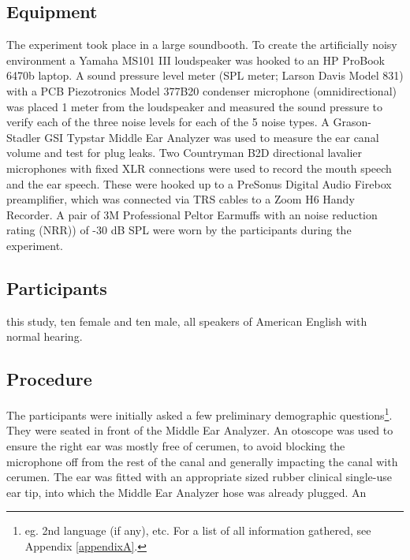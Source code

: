   
\subsection{Equipment}

The experiment took place in a large soundbooth.  To create the artificially noisy environment a Yamaha MS101 III loudspeaker was hooked to an HP ProBook 6470b laptop.  A sound pressure level meter (SPL meter; Larson Davis Model 831) with a PCB Piezotronics Model 377B20 condenser microphone (omnidirectional) was placed 1 meter from the loudspeaker and measured the sound pressure to verify each of the three noise levels for each of the 5 noise types. A Grason-Stadler GSI Typstar Middle Ear Analyzer was used to measure the ear canal volume and test for plug leaks.  Two Countryman B2D directional lavalier microphones with fixed XLR connections were used to record the mouth speech and the ear speech.  These were hooked up to a PreSonus Digital Audio Firebox preamplifier, which was connected via TRS cables to a Zoom H6 Handy Recorder. A pair of 3M Professional Peltor Earmuffs with an noise reduction rating (NRR)) of -30 dB SPL were worn by the participants during the experiment.


\subsection{Participants}
\DIFdelbegin {}\DIFdelend \DIFaddbegin {}\DIFaddend this study, \DIFaddbegin {}\DIFaddend ten female and ten male, all \DIFdelbegin {}\DIFdelend \DIFaddbegin {}\DIFaddend speakers of American English with normal hearing.

\subsection{Procedure}\label{chap2:methods:procedure}

The participants were initially asked a few preliminary demographic questions\footnote{eg. 2nd language (if any), etc. For a list of all information gathered, see Appendix \DIFdelbegin {}\DIFdelend \ref{appendixA}.}. They were seated in front of the Middle Ear Analyzer.  An otoscope was used to ensure the right ear was mostly free of cerumen, to avoid blocking the microphone off from the rest of the canal and generally impacting the canal with cerumen.  The ear was fitted with an appropriate sized rubber clinical single-use ear tip, into which the Middle Ear Analyzer hose was already plugged.  An \DIFaddbegin {}

